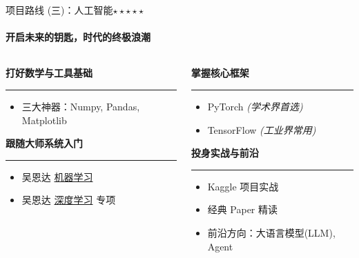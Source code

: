 \documentclass{beamer}
\newcommand{\hrefcol}[2]{\textcolor{cyan}{\href{#1}{#2}}}
\begin{document}
\begin{frame}{项目路线 (三)：人工智能$\star \star \star \star \star$}
    \framesubtitle{开启未来的钥匙，时代的终极浪潮}
    
    \begin{columns}[T]
        \begin{column}{0.5\textwidth}
            \begin{center}
                \large\textbf{打好数学与工具基础}
                \rule{0.8\linewidth}{0.4pt}
            \end{center}
            \begin{itemize}
                \item 三大神器：Numpy, Pandas, Matplotlib
            \end{itemize}

            \vfill

            \begin{center}
                \large\textbf{跟随大师系统入门}
                \rule{0.8\linewidth}{0.4pt}
            \end{center}
            \begin{itemize}
                \item 吴恩达 \hrefcol{https://www.coursera.org/learn/machine-learning}{机器学习}
                \item 吴恩达 \hrefcol{https://www.coursera.org/specializations/deep-learning}{深度学习} 专项
            \end{itemize}
        \end{column}

        \begin{column}{0.5\textwidth}
            \begin{center}
                \large\textbf{掌握核心框架}
                \rule{0.8\linewidth}{0.4pt}
            \end{center}
            \begin{itemize}
                \item PyTorch \textit{(学术界首选)}
                \item TensorFlow \textit{(工业界常用)}
            \end{itemize}

            \vfill

            \begin{center}
                \large\textbf{投身实战与前沿}
                \rule{0.8\linewidth}{0.4pt}
            \end{center}
            \begin{itemize}
                \item \alert{Kaggle} 项目实战
                \item 经典 \alert{Paper} 精读
                \item 前沿方向：大语言模型(LLM), Agent
            \end{itemize}
        \end{column}
    \end{columns}
\end{frame}
\end{document}
